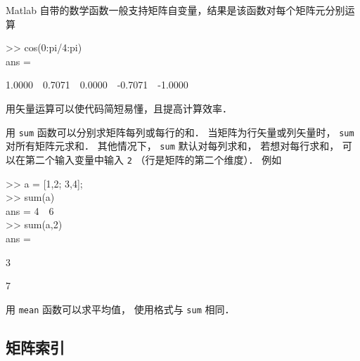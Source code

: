 Matlab 自带的数学函数一般支持矩阵自变量，结果是该函数对每个矩阵元分别运算
\begin{Command}
>> cos(0:pi/4:pi)\\
ans = \par
1.0000\ \ 0.7071\ \ 0.0000\ \ -0.7071\ \ -1.0000
\end{Command}
用矢量运算可以使代码简短易懂，且提高计算效率．

用 \texttt{sum} 函数可以分别求矩阵每列或每行的和． 当矩阵为行矢量或列矢量时， \texttt{sum} 对所有矩阵元求和． 其他情况下， \texttt{sum} 默认对每列求和， 若想对每行求和， 可以在第二个输入变量中输入 \texttt{2} （行是矩阵的第二个维度）． 例如
\begin{Command}
>> a = [1,2; 3,4];\\
>> sum(a)\\
ans = 4\ \ 6\\
>> sum(a,2)\\
ans =\par 3\par 7
\end{Command}
用 \texttt{mean} 函数可以求平均值， 使用格式与 \texttt{sum} 相同．

\subsection{矩阵索引}

